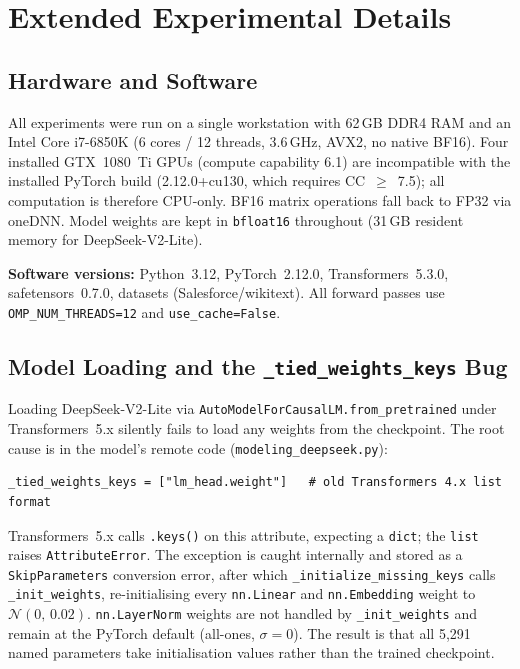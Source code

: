 
\section{Extended Experimental Details}
\label{app:experimental-details}

\subsection{Hardware and Software}
\label{app:hardware}

All experiments were run on a single workstation with 62\,GB DDR4 RAM and an
Intel Core i7-6850K (6 cores / 12 threads, 3.6\,GHz, AVX2, no native BF16).
Four installed GTX~1080~Ti GPUs (compute capability 6.1) are incompatible with
the installed PyTorch build (2.12.0+cu130, which requires CC~$\geq$~7.5); all
computation is therefore CPU-only.
BF16 matrix operations fall back to FP32 via oneDNN.
Model weights are kept in \texttt{bfloat16} throughout
(31\,GB resident memory for DeepSeek-V2-Lite).

\medskip\noindent
\textbf{Software versions:}
Python~3.12,
PyTorch~2.12.0,
Transformers~5.3.0,
safetensors~0.7.0,
datasets (Salesforce/wikitext).
All forward passes use \texttt{OMP\_NUM\_THREADS=12} and \texttt{use\_cache=False}.

\subsection{Model Loading and the \texttt{\_tied\_weights\_keys} Bug}
\label{app:loading-bug}

Loading DeepSeek-V2-Lite via \texttt{AutoModelForCausalLM.from\_pretrained}
under Transformers~5.x silently fails to load any weights from the checkpoint.
The root cause is in the model's remote code (\texttt{modeling\_deepseek.py}):

\begin{verbatim}
_tied_weights_keys = ["lm_head.weight"]   # old Transformers 4.x list format
\end{verbatim}

Transformers~5.x calls \texttt{.keys()} on this attribute, expecting a
\texttt{dict}; the \texttt{list} raises \texttt{AttributeError}.
The exception is caught internally and stored as a \texttt{SkipParameters}
conversion error, after which \texttt{\_initialize\_missing\_keys} calls
\texttt{\_init\_weights}, re-initialising every \texttt{nn.Linear} and
\texttt{nn.Embedding} weight to $\mathcal{N}(0,\,0.02)$.
\texttt{nn.LayerNorm} weights are not handled by \texttt{\_init\_weights}
and remain at the PyTorch default (all-ones, $\sigma=0$).
The result is that all 5{,}291 named parameters take initialisation values
rather than the trained checkpoint.

